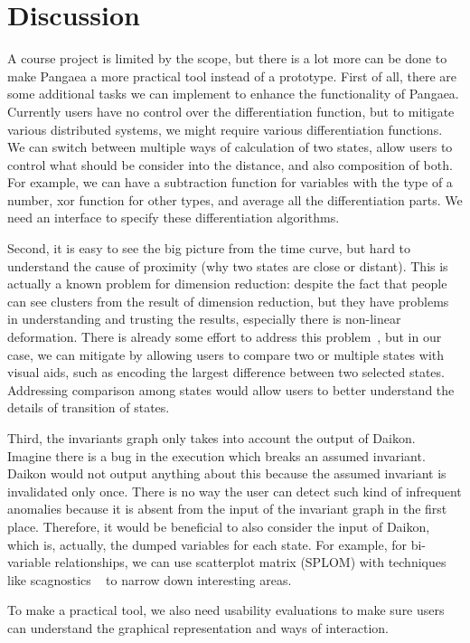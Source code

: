 \section{Discussion}
\label{sec:discussion}


A course project is limited by the scope, but there is a lot more can be done to make
Pangaea a more practical tool instead of a prototype. 
First of all, there are some additional tasks we can implement to enhance the 
functionality of Pangaea.  Currently users have no control over the differentiation
function, but to mitigate various distributed systems, we might require various 
differentiation functions.  We can switch between multiple ways of calculation of 
two states, allow users to control what should be consider into the distance, and 
also composition of both.
For example, we can have a subtraction function for variables with the type of a number,
xor function for other types, and average all the differentiation parts.
We need an interface to specify these differentiation algorithms.

Second, it is easy to see the big picture from the time curve, but hard
to understand the cause of proximity (why two states are close or distant).  This is
actually a known problem for dimension reduction: despite the fact that people
can see clusters from the result of dimension reduction, but they have problems in
understanding and trusting the results, especially there is non-linear deformation.
There is already some effort to address this problem~\cite{stahnke2016probing}, but
in our case, we can mitigate by allowing users to compare two or multiple states
with visual aids, such as encoding the largest difference between two selected states.
Addressing comparison among states would allow users to better understand 
the details of transition of states.


Third, the invariants graph only takes into account the output of Daikon.  
Imagine there is a bug in the execution which breaks an assumed invariant.  Daikon
would not output anything about this because the assumed invariant is 
invalidated only once.  There is no way the user can detect such kind of infrequent
anomalies because it is absent from the input of the invariant graph in the first
place.  Therefore, it would be beneficial to also consider the input of Daikon, which
is, actually, the dumped variables for each state.  For example, for bi-variable
relationships, we can use scatterplot matrix (SPLOM) with techniques like scagnostics
~\cite{wilkinson2006high} to narrow down interesting areas.

To make a practical tool, we also need usability evaluations to make sure users can
understand the graphical representation and ways of interaction.